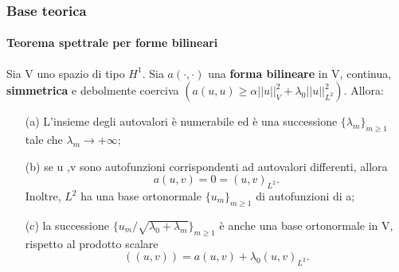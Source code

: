 \begin{frame}
  \frametitle{Base teorica}
  \framesubtitle{Teorema spettrale per forme bilineari}
  \begin{block}{}
Sia V uno spazio di tipo $H^1$.
Sia $a(\cdot,\cdot)$ una \textbf{forma bilineare} in V, continua, \textbf{simmetrica} e debolmente coerciva 
{\footnotesize $(a(u,u)\geq \alpha||u||_V^2+\lambda_0||u||^2_{L^2} )$}. Allora:
\begin{itemize}
\item[(a)] L'insieme degli autovalori \`e numerabile ed \`e una successione $\{\lambda_m \}_{m\geq 1}$ tale che  $\lambda_m\rightarrow +\infty$;
\item[(b)] se u ,v sono autofunzioni corrispondenti ad autovalori differenti, allora $$a(u,v) = 0 = (u,v)_{L^2}.$$
Inoltre, $L^2$ ha una base ortonormale $\{ u_m \}_{m\geq 1}$ di autofunzioni di a;
\item[(c)] la successione $\{u_m / \sqrt{\lambda_0+\lambda_m} \}_{m\geq 1}$ \`e anche una base ortonormale in V, rispetto al prodotto scalare
\begin{displaymath}
((u,v))=a(u,v)+\lambda_0 (u,v)_{L^2}.
\end{displaymath}
\end{itemize}
\end{block}
\end{frame}

